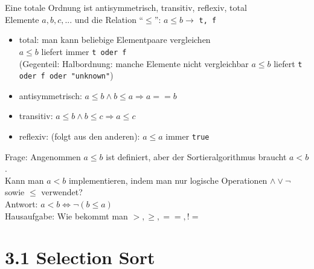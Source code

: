         Eine totale Ordnung ist antisymmetrisch, transitiv, reflexiv, total \\
        Elemente $a,b,c,...$ und die Relation ``$\leq$'': $a \leq b \rightarrow$ \verb|t, f| \\
        \begin{itemize}
                \item total: man kann beliebige Elementpaare vergleichen \\
                $a \leq b$ liefert immer \verb|t oder f| \\
                (Gegenteil: Halbordnung: manche Elemente nicht vergleichbar
                $a\leq b$ liefert \verb|t oder f oder "unknown"|)

                \item antisymmetrisch: $a \leq b \land b \leq a \Rightarrow a == b$
                \item transitiv: $ a \leq b \land b \leq c \Rightarrow a \leq c$
                \item reflexiv: (folgt aus den anderen): $a \leq a$ immer \verb|true|
        \end{itemize}

            Frage: Angenommen $a \leq b$ ist definiert, aber der Sortieralgorithmus braucht $a < b$. \\
            Kann man $a < b$ implementieren, indem man nur logische Operationen $\land \lor \lnot$ sowie $\leq$ verwendet? \\

            Antwort: $a < b \Leftrightarrow \lnot(b \leq a)$ \\

            Hausaufgabe: Wie bekommt man $>, \geq, ==, !=$ \\

            \section*{3.1 Selection Sort}

